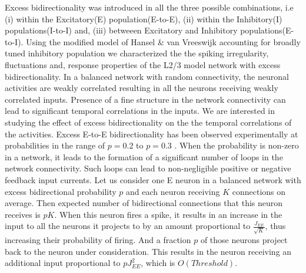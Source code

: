 Excess bidirectionality was introduced in all the three possible combinations, i.e (i) within the Excitatory(E) population(E-to-E), (ii) within the Inhibitory(I) populations(I-to-I) and, (iii) betweeen Excitatory and Inhibitory populations(E-to-I). Using the modified model of Hansel \& van Vreeswijk accounting for broadly tuned inhibitory population we characterized the the spiking irregularity, fluctuations and, response properties of the L2/3 model network with excess bidirectionality. 
In a balanced network with random connectivity, the neuronal activities are weakly correlated resulting in all the neurons receiving weakly correlated inputs. Presence of a fine structure in the network connectivity can lead to significant temporal correlations in the inputs. We are interested in studying the effect of excess bidirectionality on the the temporal correlations of the activities. Excess E-to-E bidirectionality has been observed experimentally at probabilities in the range of $p = 0.2$ to $p = 0.3$ \cite{Song2005}. When the probability is non-zero in a network, it leads to the formation of a significant number of loops in the network connectivity. Such loops can lead to non-negligible positive or negative feedback input currents. Let us consider one E neuron in a balanced network with excess bidirectional probability $p$ and each neuron receiving $K$ connections on average. Then expected number of bidirectional connections that this neuron receives is $pK$. When this neuron fires a spike, it results in an increase in the input to all the neurons it projects to by an amount proportional to $\frac{J_{EE}}{\sqrt{K}}$, thus increasing their probability of firing. And a fraction $p$ of those neurons project back to the neuron under consideration. This results in the neuron receiving an additional input proportional to $p J_{EE}^{2}$, which is $O(Threshold)$. 
